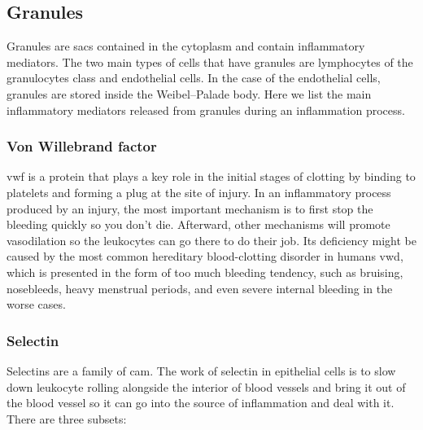  

\subsection{Granules}
\label{inf:granules}

Granules are sacs contained in the cytoplasm and contain inflammatory mediators. The two main types of cells that have granules are lymphocytes of the granulocytes class and endothelial cells. In the case of the endothelial cells, granules are stored inside the Weibel–Palade body. Here we list the main inflammatory mediators released from granules during an inflammation process.

\subsubsection{Von Willebrand factor}
\label{in:VonWill}

\gls{vwf} is a protein that plays a key role in the initial stages of clotting by binding to platelets and forming a plug at the site of injury. In an inflammatory process produced by an injury, the most important mechanism is to first stop the bleeding quickly so you don't die. Afterward, other mechanisms will promote vasodilation so the leukocytes can go there to do their job. Its deficiency might be caused by the most common hereditary blood-clotting disorder in humans \gls{vwd}, which is presented in the form of too much bleeding tendency, such as bruising, nosebleeds, heavy menstrual periods, and even severe internal bleeding in the worse cases.

\subsubsection{Selectin}
\label{in:selectin}

Selectins are a family of \gls{cam}. The work of selectin in epithelial cells is to slow down leukocyte rolling alongside the interior of blood vessels and bring it out of the blood vessel so it can go into the source of inflammation and deal with it. There are three subsets:

